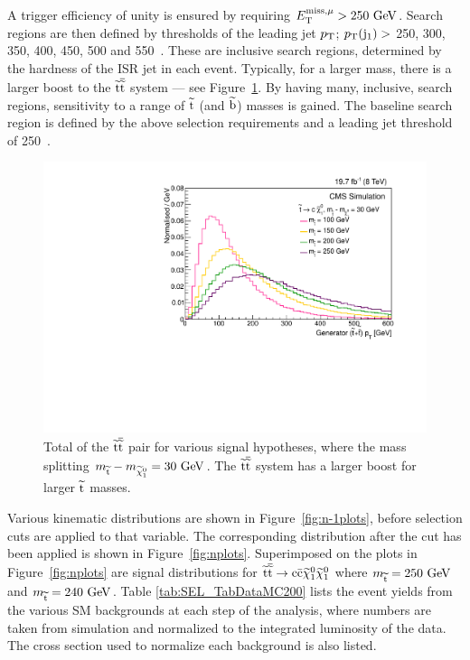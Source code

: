 A trigger efficiency of unity is ensured by requiring $E^{\rm miss, \mu}_{\rm T}>250~\mathrm{GeV}$. Search regions are then defined by thresholds of the leading jet $p_{\text{T}}$; $p_{\text{T}}({\rm j}_{1}) >$ 250, 300, 350, 400, 450, 500 and 550~\GeV.
These are inclusive search regions, determined by the hardness of the \ac{ISR} jet in each event.
Typically, for a larger \sTop{} mass, there is a larger boost to the $\widetilde{{\rm t}}\overline{\widetilde{\mathrm{t}}}${} system --- see Figure~\ref{stopstoppT}. 
By having many, inclusive, search regions, sensitivity to a range of $\widetilde{{\rm t}}${} (and $\widetilde{{\rm b}}${}) masses is gained.  
The baseline search region is defined by the above selection requirements and a leading jet threshold of 250~\GeV.

\begin{figure}%
  \begin{center}
  \includegraphics[scale=0.45]{Figures/sus13009/stopstoppt.pdf}
  \caption{Total \pt{} of the $\widetilde{{\rm t}}\overline{\widetilde{\mathrm{t}}}${} pair for various signal hypotheses, where the mass splitting $m_{\widetilde{{\rm t}}}-m_{\widetilde{\chi}^{0}_{1}} = 30~\mathrm{GeV}$. The $\widetilde{{\rm t}}\overline{\widetilde{\mathrm{t}}}${} system has a larger boost for larger $\widetilde{{\rm t}}${} masses.
         \label{stopstoppT}}
  \end{center}
\end{figure}


Various kinematic distributions are shown in Figure~\ref{fig:n-1plots}, before selection cuts are applied to that variable.
The corresponding distribution after the cut has been applied is shown in Figure~\ref{fig:nplots}.
Superimposed on the plots in Figure~\ref{fig:nplots} are signal distributions for $\widetilde{{\rm t}} \overline{\widetilde{\mathrm{t}}} \rightarrow \rm c \bar{\rm c} \widetilde{\chi}^{0}_{1} \widetilde{\chi}^{0}_{1}$ where $m_{\widetilde{{\rm t}}} = 250~\mathrm{GeV}$ and $m_{\widetilde{{\rm t}}} = 240~\mathrm{GeV}$.
Table \ref{tab:SEL_TabDataMC200} lists the event yields from the various \ac{SM} backgrounds at each step of the analysis, where numbers are taken from simulation and normalized to the integrated luminosity of the data. The cross section used to normalize each background is also listed.

